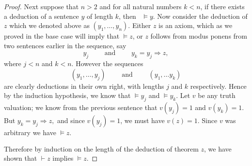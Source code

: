 \documentclass[11pt,titlepage]{article}
\newcommand{\spand}{\qquad\text{ and }\qquad}
\newcommand{\imp}{\Rightarrow}
\theoremstyle{definition}
\begin{document}
\begin{proof}
Next suppose that $n>2$ and for all natural numbers $k< n$, if there exists a deduction of a sentence $y$ of length $k$, then \ $\vDash y$. Now consider the deduction of $z$ which we denoted above as $(y_1,\ldots,y_n)$. Either $z$ is an axiom, which as we proved in the base case will imply that $\vDash z$, or $z$ follows from modus ponens from two sentences earlier in the sequence, say $$y_j \spand y_k=y_j\imp z,$$ where $j<n$ and $k<n$. However the sequences $$(y_1,\ldots, y_j) \spand (y_1,\ldots y_k)$$ are clearly deductions in their own right, with lengths $j$ and $k$ respectively. Hence by the induction hypothesis, we know that $\vDash y_j$ and $\vDash y_k$. Let $v$ be any truth valuation; we know from the previous sentence that $v(y_j)=1$ and $v(y_k)=1$. But $y_k = y_j \imp z,$ and since $v(y_j)=1$, we must have $v(z)=1$. Since $v$ was arbitrary we have $\vDash z$.

Therefore by induction on the length of the deduction of theorem $z$, we have shown that $\vdash z$ implies $\vDash z$.
\end{proof}
\end{document}
